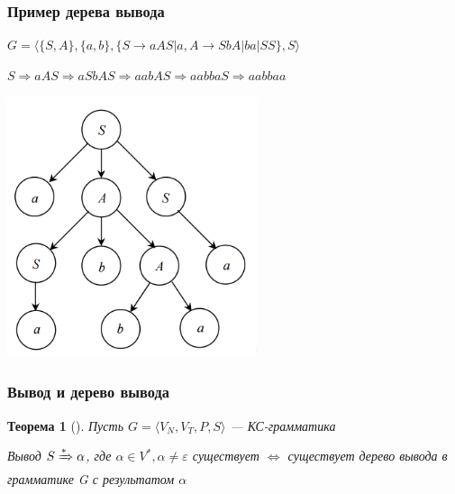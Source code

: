 \documentclass{beamer}
\newtheorem{rutheorem}{Теорема}
\begin{document}
\begin{frame}[fragile]
  \transwipe[direction=90]
  \frametitle{Пример дерева вывода}
\begin{centering}

$G = \langle \{ S, A \}, \{ a, b \}, \{ S \rightarrow a A S | a, A \rightarrow S b A | b a | SS \}, S\rangle$  

$S \Rightarrow aAS \Rightarrow a S b A S \Rightarrow a a b A S \Rightarrow a a b b a S \Rightarrow a a b b a a$
    
  \includegraphics[width=0.55\textwidth]{pics/tree.png}  

\end{centering}
\end{frame}

\begin{frame}[fragile]
  \transwipe[direction=90]
  \frametitle{Вывод и дерево вывода}
  \begin{rutheorem}[]
    Пусть $G = \langle V_N, V_T, P, S \rangle$ --- КС-грамматика
    
    Вывод $S \xRightarrow[]{*} \alpha$, где $\alpha \in V^*, \alpha \neq \varepsilon$ существует $\Leftrightarrow$ существует дерево вывода в грамматике G с результатом $\alpha$
  \end{rutheorem}

\end{frame}
\end{document}
